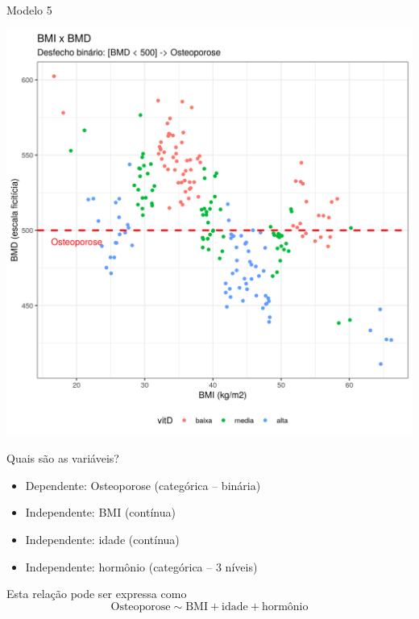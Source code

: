 \documentclass{beamer}
\begin{document}
\begin{frame}{\scriptsize Modelo 5}
  \begin{center}
    \includegraphics[height=.9\textheight]{Cap31-32/pratica-glm5}
  \end{center}
\end{frame}

\begin{frame}{\scriptsize Quais são as variáveis?}
  \begin{itemize}
    \footnotesize
  \item \alert{Dependente: Osteoporose (categórica -- binária)}
  \item Independente: BMI (contínua)
  \item Independente: idade (contínua)
  \item Independente: hormônio (categórica -- 3 níveis)
  \end{itemize}
  \vfill
  \begin{block}{Esta relação pode ser expressa como}
    \footnotesize
    \begin{displaymath}
      \text{Osteoporose} \sim \text{BMI} + \text{idade} +\text{hormônio}
    \end{displaymath}
  \end{block}
\end{frame}
\end{document}
